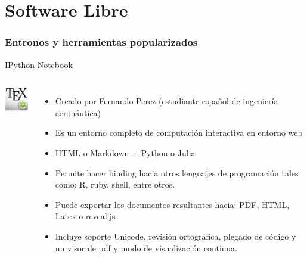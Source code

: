 \documentclass[sans serif,9pt,xcolor=dvipsnames]{beamer}%
\begin{document}
\section{Software Libre}
\begin{frame}
\frametitle {Entronos y herramientas popularizados}
\justifying
\begin{block}{IPython Notebook}
\begin{columns}
 \hspace{0.7cm}
\includegraphics[width=1.8cm]{imagenes/texmaker.png} 
\begin{itemize}
\justifying
\item Creado por Fernando Perez (estudiante español de ingeniería aeronáutica)
\item Es un entorno completo de computación interactiva en entorno web
\item HTML o Markdown + Python o Julia
\item Permite hacer binding hacia otros lenguajes de programación tales como: R, ruby, shell, entre otros.
\item Puede exportar los documentos resultantes hacia: PDF, HTML, Latex o reveal.js 
\item Incluye soporte Unicode, revisión ortográfica, plegado de código y un visor de pdf y modo de visualización continua.
\end{itemize}
\end{columns}
\end{block}
\end{frame}
\end{document}
